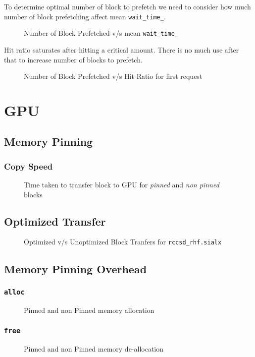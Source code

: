 To determine optimal number of block to prefetch we need to consider how much
number of block prefetching affect mean \texttt{wait\_time\_}.
\begin{figure}[h]
  
  \caption{Number of Block Prefetched v/s mean \texttt{wait\_time\_}}
\end{figure}

Hit ratio saturates after hitting a critical amount. There is no much use after
that to increase number of blocks to prefetch.
\begin{figure}[h]
  
  \caption{Number of Block Prefetched v/s Hit Ratio for first request}
\end{figure}

\section{GPU}
\subsection{Memory Pinning}
\subsubsection{Copy Speed}
\begin{figure}[h]
  
  \caption{Time taken to transfer block to GPU for \textit{pinned} and \textit{non pinned} blocks}
\end{figure}
\subsection{Optimized Transfer}
\begin{figure}[h]
  
  \caption{Optimized v/s Unoptimized Block Tranfers for \texttt{rccsd\_rhf.sialx}}
\end{figure}

\subsection{Memory Pinning Overhead}
\subsubsection{\texttt{alloc}}
\begin{figure}[h]
  
  \caption{Pinned and non Pinned memory allocation}
\end{figure}

\subsubsection{\texttt{free}}
\begin{figure}[h]
  
  \caption{Pinned and non Pinned memory de-allocation}
\end{figure}